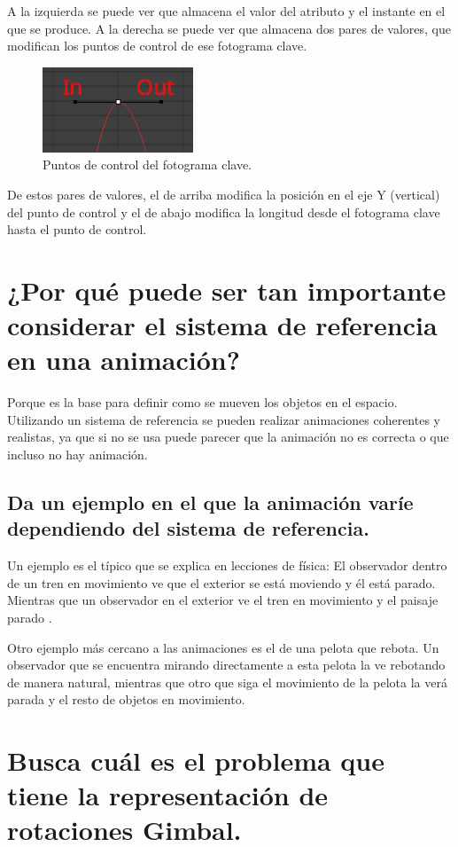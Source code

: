 \documentclass{article}
\begin{document}
A la izquierda se puede ver que almacena el valor del atributo y el instante en el que se produce. A la derecha se puede ver que almacena dos pares de valores, que modifican los puntos de control de ese fotograma clave.

\begin{figure}[H]
    \centering
    \includegraphics[width=0.4\textwidth]{imagenes/4-2.png}
    \caption{Puntos de control del fotograma clave.}
\end{figure}

De estos pares de valores, el de arriba modifica la posición en el eje Y (vertical) del punto de control y el de abajo modifica la longitud desde el fotograma clave hasta el punto de control.

\section{¿Por qué puede ser tan importante considerar el sistema de referencia en una animación?}
Porque es la base para definir como se mueven los objetos en el espacio. Utilizando un sistema de referencia se pueden realizar animaciones coherentes y realistas, ya que si no se usa puede parecer que la animación no es correcta o que incluso no hay animación.
\subsection{Da un ejemplo en el que la animación varíe dependiendo del sistema de referencia.}
Un ejemplo es el típico que se explica en lecciones de física: El observador dentro de un tren en movimiento ve que el exterior se está moviendo y él está parado. Mientras que un observador en el exterior ve el tren en movimiento y el paisaje parado \cite{explicacion}.

\bigskip

Otro ejemplo más cercano a las animaciones es el de una pelota que rebota. Un observador que se encuentra mirando directamente a esta pelota la ve rebotando de manera natural, mientras que otro que siga el movimiento de la pelota la verá parada y el resto de objetos en movimiento.

\section{Busca cuál es el problema que tiene la representación de rotaciones Gimbal.}
\end{document}
